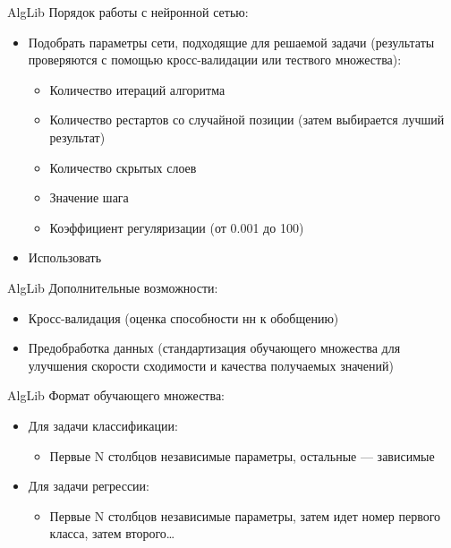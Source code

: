 \documentclass{beamer}
\begin{document}
\begin{frame}{AlgLib}
    Порядок работы с нейронной сетью:
    \begin{itemize}
        \item Подобрать параметры сети, подходящие для решаемой задачи
            (результаты проверяются с помощью кросс-валидации или тествого
            множества):
            \begin{itemize}
                \item Количество итераций алгоритма
                \item Количество рестартов со случайной позиции (затем
                    выбирается лучший результат)
                \item Количество скрытых слоев
                \item Значение шага
                \item Коэффициент регуляризации (от 0.001 до 100)
            \end{itemize}
        \item Использовать
    \end{itemize}
\end{frame}

\begin{frame}{AlgLib}
    Дополнительные возможности:
    \begin{itemize}
        \item Кросс-валидация (оценка способности нн к обобщению)
        \item Предобработка данных (стандартизация обучающего множества для
            улучшения скорости сходимости и качества получаемых значений)
    \end{itemize}
\end{frame}

\begin{frame}{AlgLib}
    Формат обучающего множества:
    \begin{itemize}
        \item Для задачи классификации:
            \begin{itemize}
                \item Первые N столбцов независимые параметры, остальные —
                    зависимые
            \end{itemize}
        \item Для задачи регрессии:
            \begin{itemize}
                \item Первые N столбцов независимые параметры, затем идет номер
                    первого класса, затем второго\ldots
            \end{itemize}
    \end{itemize}
\end{frame}
\end{document}
